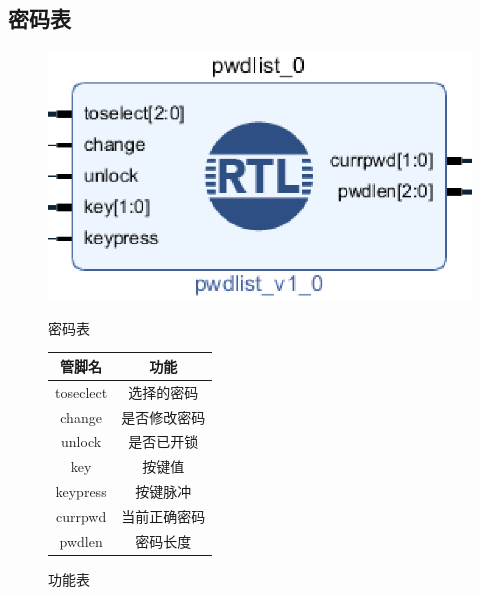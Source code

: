 \documentclass[a4paper,11pt]{ctexart}
\begin{document}
\subsection{密码表}
\begin{figure}[htb]
  \begin{minipage}[b]{0.5\textwidth}
    \centering
    \includegraphics[width = \textwidth]{./images/pwdlist.eps}
    \caption{密码表}
    \label{fig:by:table}
  \end{minipage}%
  \begin{minipage}[b]{0.5\textwidth}
    \centering
    \begin{tabular}{|c|c|} \hline
      管脚名 & 功能 \\ \hline\hline
      toseclect     &   选择的密码 \\
      change        & 是否修改密码 \\
      unlock        & 是否已开锁 \\
      key           & 按键值 \\
      keypress      & 按键脉冲 \\
      currpwd       & 当前正确密码\\
      pwdlen        & 密码长度 \\ \hline
    \end{tabular}
    \caption{功能表}
    \label{table:by:fig}
  \end{minipage}
\end{figure}
\end{document}
